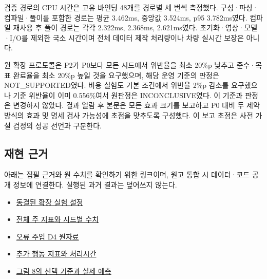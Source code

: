 \documentclass[11pt,a4paper]{article}
\begin{document}
검증 경로의 CPU 시간은 고유 바인딩 48개를 경로별 세 번씩 측정했다. 구성·파싱·컴파일·풀이를 포함한 경로는 평균 3.462ms, 중앙값 3.524ms, p95 3.782ms였다. 컴파일 재사용 후 풀이 경로는 각각 2.322ms, 2.368ms, 2.621ms였다. 초기화·영상·모델·I/O를 제외한 국소 시간이며 전체 데이터 제작 처리량이나 차량 실시간 보장은 아니다.\par

원 확장 프로토콜은 P2가 P0보다 모든 시드에서 위반율을 최소 20\%p 낮추고 준수·목표 완료율을 최소 20\%p 높일 것을 요구했으며, 해당 운영 기준의 판정은 NOT\_SUPPORTED였다. 비용 실험도 기본 조건에서 위반율 2\%p 감소를 요구했으나 기준 위반율이 이미 0.556\%여서 원판정은 INCONCLUSIVE였다. 이 기준과 판정은 변경하지 않았다. 결과 열람 후 본문은 모든 효과 크기를 보고하고 P0 대비 두 제약 방식의 효과 및 명세 검사 가능성에 초점을 맞추도록 구성했다. 이 보고 초점은 사전 가설 검정의 성공 선언과 구분한다.\par

\begingroup\small\setlength{\parskip}{3pt}
\subsection*{재현 근거}

아래는 집필 근거와 원 수치를 확인하기 위한 링크이며, 원고 통합 시 데이터·코드 공개 정보에 연결한다. 실행된 과거 결과는 덮어쓰지 않는다.\par

\begin{itemize}\setlength{\itemsep}{0pt}\setlength{\parsep}{0pt}\setlength{\topsep}{2pt}
\item \href{\detokenize{../temporal-expansion-protocol-2026-09-29-001/protocol.json}}{동결된 확장 실험 설정}
\item \href{\detokenize{../temporal-experiment-closure-2026-09-29-001/all_primary_metrics.csv}}{전체 주 지표와 시드별 수치}
\item \href{\detokenize{../../paper1-temporal-diversity-001/diversity-analysis-2026-09-29-001/RESULT.json}}{오류 주입 D4 원자료}
\item \href{\detokenize{../temporal-secondary-metrics-2026-09-29-001/RESULT.json}}{추가 행동 지표와 처리시간}
\item \href{\detokenize{selected_cases.json}}{그림 8의 선택 기준과 실제 예측}
\end{itemize}
\endgroup
\end{document}
